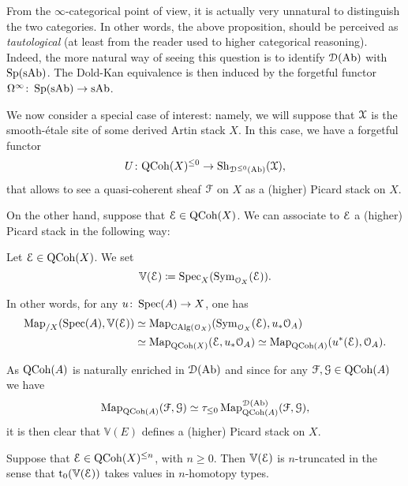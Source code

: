\begin{rem}
	From the $\infty$-categorical point of view, it is actually very unnatural to distinguish the two categories.
	In other words, the above proposition, should be perceived as \emph{tautological} (at least from the reader used to higher categorical reasoning).
	Indeed, the more natural way of seeing this question is to identify $\mathcal D(\mathrm{Ab})$ with $\operatorname{Sp}(\mathrm{sAb})$. The Dold-Kan equivalence is then induced by the forgetful functor $\Omega^\infty \colon \operatorname{Sp}(\mathrm{sAb}) \to \mathrm{sAb}$.
\end{rem}

We now consider a special case of interest: namely, we will suppose that $\mathcal X$ is the smooth-\'etale site of some derived Artin stack $X$.
In this case, we have a forgetful functor
\[ U \colon \mathrm{QCoh}(X)^{\le 0} \to \mathrm{Sh}_{\mathcal D^{\le 0}(\mathrm{Ab})}(\mathcal X) , \]
that allows to see a quasi-coherent sheaf $\mathcal F$ on $X$ as a (higher) Picard stack on $X$.

On the other hand, suppose that $\mathcal E \in \mathrm{QCoh}(X)$.
We can associate to $\mathcal E$ a (higher) Picard stack in the following way:

\begin{defin}
	Let $\mathcal E \in \mathrm{QCoh}(X)$.
	We set
	\[ \mathbb V(\mathcal E) \coloneqq \operatorname{Spec}_X(\operatorname{Sym}_{\mathcal O_X}(\mathcal E)) . \]
\end{defin}

\begin{rem}
	In other words, for any $u \colon \operatorname{Spec}(A) \to X$, one has
	\begin{align*}
		\operatorname{Map}_{/X}(\operatorname{Spec}(A), \mathbb V(\mathcal E)) & \simeq \operatorname{Map}_{\mathrm{CAlg}(\mathcal O_X)}(\operatorname{Sym}_{\mathcal O_X}(\mathcal E), u_* \mathcal O_A) \\
		& \simeq \operatorname{Map}_{\mathrm{QCoh}(X)}(\mathcal E, u_* \mathcal O_A) \simeq \operatorname{Map}_{\mathrm{QCoh}(A)}(u^*(\mathcal E), \mathcal O_A) .
	\end{align*}
\end{rem}

As $\mathrm{QCoh}(A)$ is naturally enriched in $\mathcal D(\mathrm{Ab})$ and since for any $\mathcal F, \mathcal G \in \mathrm{QCoh}(A)$ we have
\[ \operatorname{Map}_{\mathrm{QCoh}(A)}(\mathcal F, \mathcal G) \simeq \tau_{\le 0} \operatorname{Map}_{\mathrm{QCoh}(A)}^{\mathcal D(\mathrm{Ab})}(\mathcal F, \mathcal G) , \]
it is then clear that $\mathbb V(E)$ defines a (higher) Picard stack on $X$.

\begin{rem}
	Suppose that $\mathcal E \in \mathrm{QCoh}(X)^{\le n}$, with $n \ge 0$.
	Then $\mathbb V(\mathcal E)$ is $n$-truncated in the sense that $\mathrm{t}_0(\mathbb V(\mathcal E))$ takes values in $n$-homotopy types.
\end{rem}

